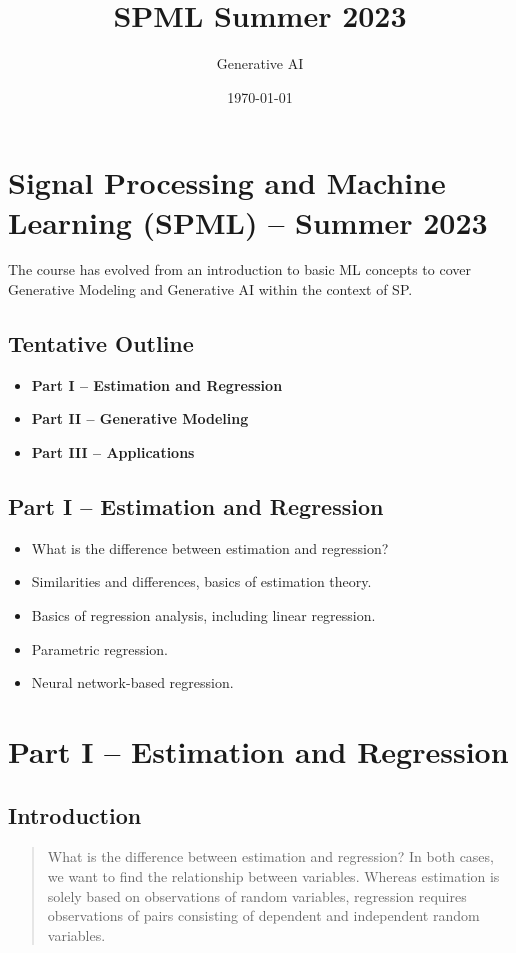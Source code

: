 \documentclass[a4paper, 11pt]{article}
\title{SPML Summer 2023}
\author{Generative AI}
\date{\today}
\begin{document}
\maketitle
\section{Signal Processing and Machine Learning (SPML) – Summer 2023}

The course has evolved from an introduction to basic ML concepts to cover Generative Modeling and Generative AI within the context of SP.

\subsection{Tentative Outline}
\begin{itemize}
    \item \textbf{Part I – Estimation and Regression}
    \item \textbf{Part II – Generative Modeling}
    \item \textbf{Part III – Applications}
\end{itemize}

\subsection{Part I – Estimation and Regression}
\begin{itemize}
    \item What is the difference between estimation and regression?
    \item Similarities and differences, basics of estimation theory.
    \item Basics of regression analysis, including linear regression.
    \item Parametric regression.
    \item Neural network-based regression.
\end{itemize}

\section{Part I – Estimation and Regression}

\subsection{Introduction}
\begin{quote}
What is the difference between estimation and regression? In both cases, we want to find the relationship between variables. Whereas estimation is solely based on observations of random variables, regression requires observations of pairs consisting of dependent and independent random variables.
\end{quote}
\end{document}
